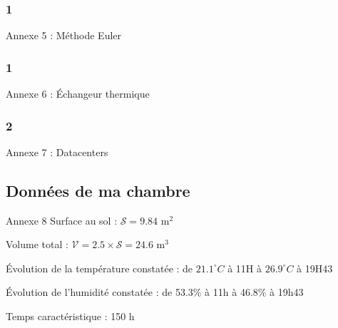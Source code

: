\documentclass[hyperref={pdfpagelabels=false}]{beamer}
\begin{document}
\subsubsection*{1}\label{a51}
\begin{frame}{Annexe 5 : Méthode Euler {\textcolor{ultramarine}{\hyperlink{t3}{}}} }
{\color{black}\footnotesize }
\end{frame}

\subsubsection*{1}\label{a52}
\begin{frame}{Annexe 6 : Échangeur thermique {\textcolor{ultramarine}{\hyperlink{e23}{}}} }
{\color{black}\footnotesize}
\end{frame}

\subsubsection*{2}\label{a53}
\begin{frame}{Annexe 7 : Datacenters {\textcolor{ultramarine}{\hyperlink{e16}{}}} }
{\color{black}\footnotesize}
\end{frame}


\subsection*{Données de ma chambre}\label{a6}

\begin{frame}{Annexe 8 {\textcolor{ultramarine}{\hyperlink{pb}{}}} }
Surface au sol : $\mathcal{S} = 9.84$ m$^2$ \par

Volume total : $\mathcal{V} = 2.5 \times \mathcal{S} = 24.6 $ m$^3$ \par



Évolution de la température constatée : de $21.1^{\circ}C$ à 11H à $26.9^{\circ}C$ à 19H43 \par

Évolution de l'humidité constatée : de 53.3$\%$ à 11h à 46.8$\%$ à 19h43 \par 


Temps caractéristique : 150 h 
\end{frame}
\end{document}

